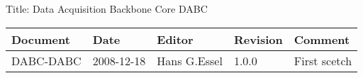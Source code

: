 Title: Data Acquisition Backbone Core DABC
\begin{table}[h]
\begin{tabular}{|p{2.8cm}|p{2.0cm}|p{3.0cm}|p{1.6cm}|p{5.0cm}|} \hline
Document   & Date        & Editor       & Revision & Comment \\
\hline DABC-DABC & 2008-12-18 & Hans G.Essel & 1.0.0      &
First scetch \\ \hline
\end{tabular}
\end{table}
